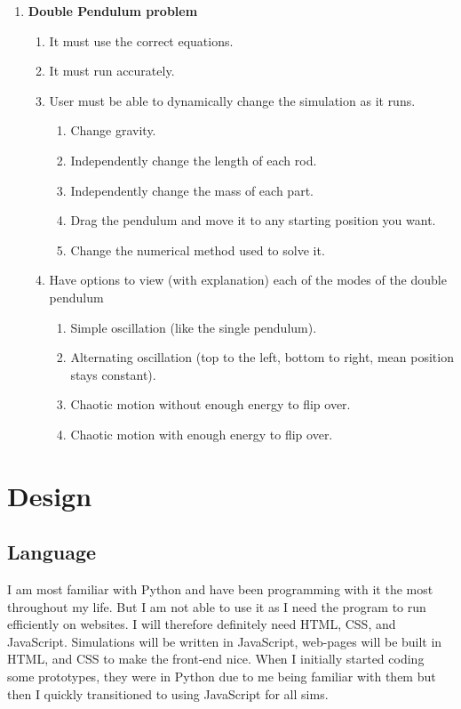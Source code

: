 \documentclass[12pt]{article}
\begin{document}
\begin{enumerate}[label=\textbf{\arabic*}.]
\begin{enumerate}[label*=\textbf{\arabic*}.]
    \end{enumerate}
    \item \textbf{Double Pendulum problem}
    \begin{enumerate}[label*=\textbf{\arabic*}.]
        \item It must use the correct equations.
        \item It must run accurately.
        \item User must be able to dynamically change the simulation as it runs.
        \begin{enumerate}[label*=\textbf{\arabic*}.]
            \item Change gravity.
            \item Independently change the length of each rod.
            \item Independently change the mass of each part.
            \item Drag the pendulum and move it to any starting position you want.
            \item Change the numerical method used to solve it.
        \end{enumerate}
        \item Have options to view (with explanation) each of the modes of the double pendulum
        \begin{enumerate}[label*=\textbf{\arabic*}.]
            \item Simple oscillation (like the single pendulum).
            \item Alternating oscillation (top to the left, bottom to right, mean position stays constant).
            \item Chaotic motion without enough energy to flip over.
            \item Chaotic motion with enough energy to flip over.
        \end{enumerate}
    \end{enumerate}
\end{enumerate}



\newpage
\section{Design}

\subsection{Language}
I am most familiar with Python and have been programming with it the most throughout my life. But I am not able to use it as I need the program to run efficiently on websites. I will therefore definitely need HTML, CSS, and JavaScript. Simulations will be written in JavaScript, web-pages will be built in HTML, and CSS to make the front-end nice. When I initially started coding some prototypes, they were in Python due to me being familiar with them but then I quickly transitioned to using JavaScript for all sims.
\end{document}
